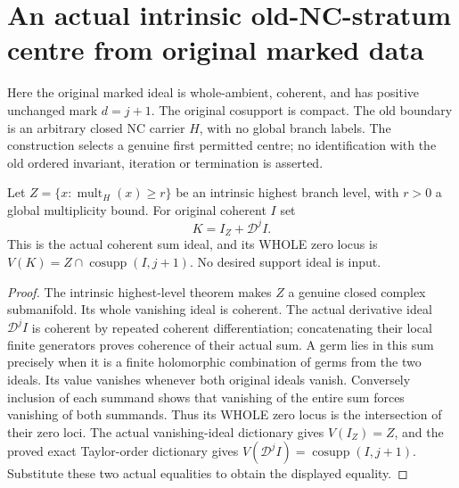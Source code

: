 \section{An actual intrinsic old-NC-stratum centre from original marked data}
\label{sec:nc-intrinsic-stratum-centre}

Here the original marked ideal is whole-ambient, coherent, and has positive
unchanged mark $d=j+1$. The original cosupport is compact. The old boundary
is an arbitrary closed NC carrier $H$, with no global branch labels.
The construction selects a genuine first permitted centre; no identification
with the old ordered invariant, iteration or termination is asserted.

\begin{theorem}
\label{hir:nc-intrinsic-stratum-detection-ideal}
Let $Z=\{x:\operatorname{mult}_H(x)\ge r\}$ be an intrinsic highest branch
level, with $r>0$ a global multiplicity bound. For original coherent $I$ set
\[
 K=I_Z+\mathcal D^j I.
\]
This is the actual coherent sum ideal, and its WHOLE zero locus is
$V(K)=Z\cap\operatorname{cosupp}(I,j+1)$. No desired support ideal is input.
\leanok
\end{theorem}
\begin{proof}
The intrinsic highest-level theorem makes $Z$ a genuine closed complex
submanifold. Its whole vanishing ideal is coherent. The actual derivative
ideal $\mathcal D^jI$ is coherent by repeated coherent differentiation;
concatenating their local finite generators proves coherence of their
actual sum. A germ lies in this sum precisely when it is a finite
holomorphic combination of germs from the two ideals. Its value vanishes
whenever both original ideals vanish. Conversely inclusion of each summand
shows that vanishing of the entire sum forces vanishing of both summands.
Thus its WHOLE zero locus is the intersection of their zero loci. The
actual vanishing-ideal dictionary gives $V(I_Z)=Z$, and the proved exact
Taylor-order dictionary gives
$V(\mathcal D^jI)=\operatorname{cosupp}(I,j+1)$. Substitute these two
actual equalities to obtain the displayed equality.
\end{proof}

